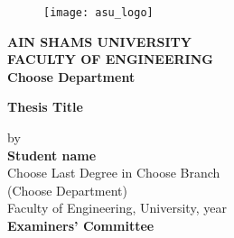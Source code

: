 \cleardoublepage
\newpage
\thispagestyle{empty}
\newlength{\thenamewidth}
\newlength{\thesignaturewidth}
\newlength{\nameskip}

\setlength{\thenamewidth}{8cm}
\setlength{\thesignaturewidth}{4cm}
\setlength{\nameskip}{0.8cm}


 \begin{center}
\begin{figure}
  \begin{center}
    \texttt{[image: asu\_logo]}
  \end{center}
\end{figure}
\small


\textbf{AIN SHAMS UNIVERSITY\\
	FACULTY OF ENGINEERING\\
	Choose Department}



\vfill
\Large
\textbf{Thesis Title} \\ 

\vfill
\small

by\\
\large
\textbf{Student name}\\
\small
Choose Last Degree in Choose Branch  \\
(Choose Department)\\
Faculty of Engineering, University, year\\










\vspace{3em}
\textbf{Examiners' Committee}

\end{center} 

